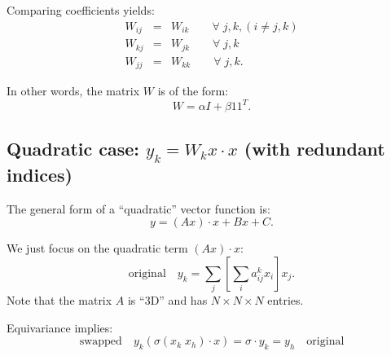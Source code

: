 Comparing coefficients yields:
\begin{eqnarray}
W_{ij} &=& W_{ik} \quad \quad \forall \; j, k, (i \neq j, k) \nonumber \\
W_{kj} &=& W_{jk} \quad \quad \forall \; j, k \nonumber \\
W_{jj} &=& W_{kk} \quad \quad \forall \; j, k .
\end{eqnarray}

In other words, the matrix $W$ is of the form:
\begin{equation}
W = \alpha I + \beta 1 1^T .
\end{equation}

\subsection{Quadratic case: $y_k = W_k x \cdot x$ (with redundant indices)}

The general form of a ``quadratic'' vector function is:
\begin{equation}
y = (A x) \cdot x + B x + C .
\end{equation}

We just focus on the quadratic term $(A x) \cdot x$:
\begin{equation}
\boxed{\mbox{original}} \quad y_k = \sum_j \left[ \sum_i a_{ij}^k x_i \right] x_j .
\end{equation}
Note that the matrix $A$ is ``3D'' and has $N \times N \times N$ entries.

Equivariance implies:
\begin{equation}
\boxed{\mbox{swapped}} \quad y_k ( \sigma(x_k \; x_h) \cdot x) = \sigma \cdot y_k = y_h \quad \boxed{\mbox{original}}
\end{equation}


